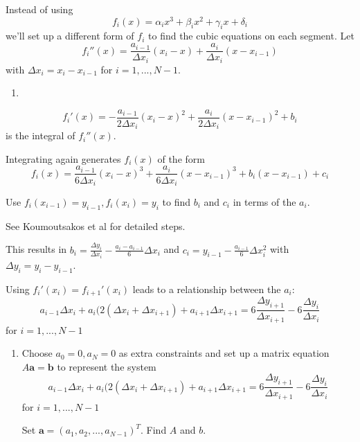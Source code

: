 \documentclass[12pt,letterpaper,noanswers]{exam}
\newcommand{\vc}[1]{\boldsymbol{#1}}
\begin{document}
\begin{tcolorbox}
Instead of using \[f_i(x) = \alpha_i x^3 + \beta_i x^2 + \gamma_i x + \delta_i\]
we'll set up a different form of $f_i$ to find the cubic equations on each segment.  Let \[f_i''(x) = \frac{a_{i-1}}{\Delta x_i}(x_i-x) + \frac{a_i}{\Delta x_i}(x-x_{i-1})\]
with $\Delta x_i = x_i-x_{i-1}$ for $i=1,...,N-1$.
\end{tcolorbox}
\begin{enumerate}[resume=classQ]
\item 
{}
\end{enumerate}
\begin{tcolorbox}
\[f_i'(x) = -\frac{a_{i-1}}{2\Delta x_i}(x_i-x)^2 + \frac{a_i}{2\Delta x_i}(x-x_{i-1})^2+b_i\] is the integral of $f_i''(x)$.

Integrating again generates $f_i(x)$ of the form
\[f_i(x) = \frac{a_{i-1}}{6\Delta x_i}(x_i-x)^3 + \frac{a_i}{6\Delta x_i}(x-x_{i-1})^3+b_i(x-x_{i-1})+ c_i\]

Use $f_{i}(x_{i-1}) = y_{i-1}, f_{i}(x_{i}) = y_{i}$ to find $b_i$ and $c_i$ in terms of the $a_i$.

See Koumoutsakos et al for detailed steps.

This results in $b_i = \frac{\Delta y_i}{\Delta x_i} - \frac{a_i-a_{i-1}}{6}\Delta x_i$ and $c_i = y_{i-1} - \frac{a_{i-1}}{6}\Delta x_i^2$ with $\Delta y_i = y_i - y_{i-1}$.

Using $f_i'(x_i) = f_{i+1}'(x_i)$ leads to a relationship between the $a_i$:
\[a_{i-1}\Delta x_i + a_i (2(\Delta x_i + \Delta x_{i+1}) + a_{i+1} \Delta x_{i+1} = 6\frac{\Delta y_{i+1}}{\Delta x_{i+1}} - 6\frac{\Delta y_i}{\Delta x_i}\] for $i = 1,...,N-1$
\end{tcolorbox}

\begin{enumerate}[resume=classQ]
\item Choose $a_0 = 0, a_N = 0$ as extra constraints and set up a matrix equation $A\vc{a} = \vc{b}$ to represent the system \[a_{i-1}\Delta x_i + a_i (2(\Delta x_i + \Delta x_{i+1}) + a_{i+1} \Delta x_{i+1} = 6\frac{\Delta y_{i+1}}{\Delta x_{i+1}} - 6\frac{\Delta y_i}{\Delta x_i}\] for $i = 1,...,N-1$

Set $\vc{a} = (a_1,a_2,...,a_{N-1})^T$.  Find $A$ and $b$.
\vspace{1.5in}

\end{enumerate}
\end{document}
